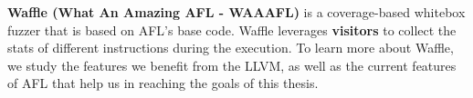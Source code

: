 \vspace{1.5\baselineskip}

\textbf{Waffle (What An Amazing AFL - WAAAFL)} is a coverage-based whitebox fuzzer that is based on AFL's base code. Waffle leverages \textbf{visitors} to collect the stats of different instructions during the execution. To learn more about Waffle, we study the features we benefit from the LLVM, as well as the current features of AFL that help us in reaching the goals of this thesis.
